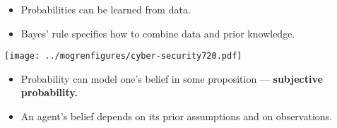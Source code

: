 \documentclass[12pt]{beamer} %
\begin{document}
\begin{slide}
\begin{itemize}
  \item Probabilities can be learned from data.
  \item Bayes' rule specifies how to combine data and prior knowledge.
\end{itemize}

\begin{center}
\texttt{[image: ../mogrenfigures/cyber-security720.pdf]}
\end{center}
\end{slide}


\begin{slide}
\begin{itemize}
\item Probability can model one's belief in some
proposition --- \textbf{subjective probability.}
\item An agent's belief depends on its prior assumptions and on observations.
\end{itemize}
\end{slide}
\end{document}
